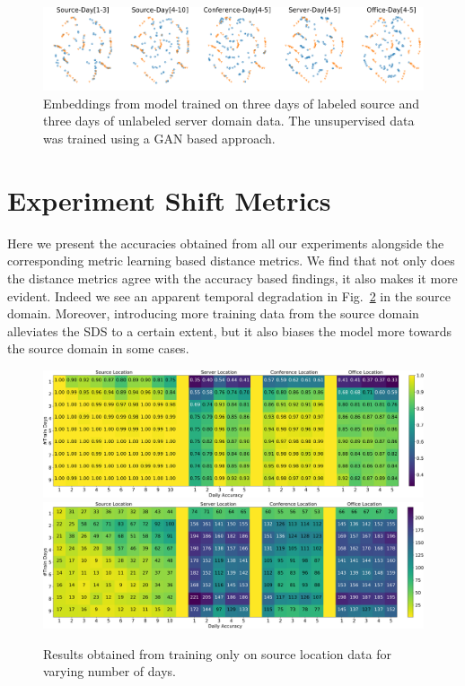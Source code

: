 \documentclass{article}
\begin{document}
\begin{figure}[H]
\includegraphics[width=\linewidth]{figures_supp/TargetUnLabelled330.png} 
\caption{Embeddings from model trained on three days of labeled source and three days of unlabeled server domain data. The unsupervised data was trained using a GAN based approach.}
\label{uda}
\end{figure}

\section{Experiment Shift Metrics}

Here we present the accuracies obtained from all our experiments alongside the corresponding metric learning based distance metrics. We find that not only does the distance metrics agree with the accuracy based findings, it also makes it more evident. Indeed we see an apparent temporal degradation in Fig.~\ref{srconly} in the source domain. Moreover, introducing more training data from the source domain alleviates the SDS to a certain extent, but it also biases the model more towards the source domain in some cases.

\begin{figure}[H]
\includegraphics[width=\linewidth]{figures_supp/Exp1.png} 
\includegraphics[width=\linewidth]{figures_supp/Exp1-metric.png} 
\caption{Results obtained from training only on source location data for varying number of days.}
\label{srconly}
\end{figure}
\end{document}
